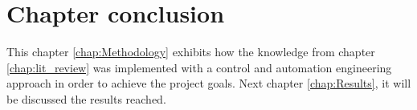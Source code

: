 \section{Chapter conclusion}

This chapter \ref{chap:Methodology} exhibits how the knowledge from chapter \ref{chap:lit_review} was implemented with a control and automation engineering approach in order to achieve the project goals. 
Next chapter \ref{chap:Results}, it will be discussed the results reached.




\clearpage